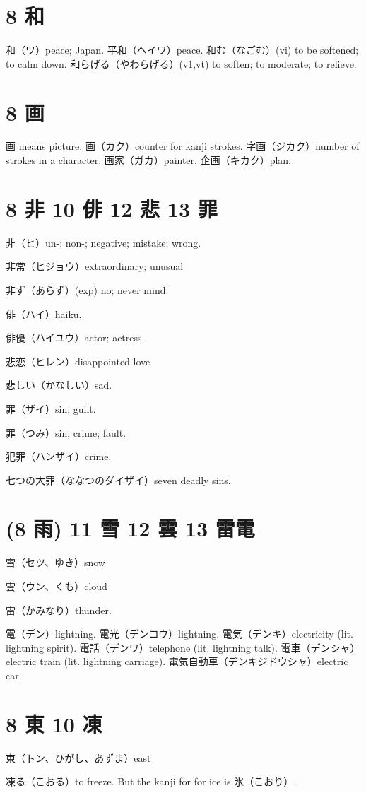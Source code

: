 \section{8 和}

和（ワ）peace; Japan.
平和（ヘイワ）peace.
和む（なごむ）(vi) to be softened; to calm down.
和らげる（やわらげる）(v1,vt) to soften; to moderate; to relieve.

\section{8 画}

画 means picture.
画（カク）counter for kanji strokes.
字画（ジカク）number of strokes in a character.
画家（ガカ）painter.
企画（キカク）plan.

\section{8 非 10 俳 12 悲 13 罪}

非（ヒ）un-; non-; negative; mistake; wrong.

非常（ヒジョウ）extraordinary; unusual

非ず（あらず）(exp) no; never mind.

俳（ハイ）haiku.

俳優（ハイユウ）actor; actress.

悲恋（ヒレン）disappointed love

悲しい（かなしい）sad.

罪（ザイ）sin; guilt.

罪（つみ）sin; crime; fault.

犯罪（ハンザイ）crime.

七つの大罪（ななつのダイザイ）seven deadly sins.

\section{(8 雨) 11 雪 12 雲 13 雷電}

雪（セツ、ゆき）snow

雲（ウン、くも）cloud

雷（かみなり）thunder.

電（デン）lightning.
電光（デンコウ）lightning.
電気（デンキ）electricity (lit. lightning spirit).
電話（デンワ）telephone (lit. lightning talk).
電車（デンシャ）electric train (lit. lightning carriage).
電気自動車（デンキジドウシャ）electric car.

\section{8 東 10 凍}

東（トン、ひがし、あずま）east

凍る（こおる）to freeze.
But the kanji for for ice is 氷（こおり）.
